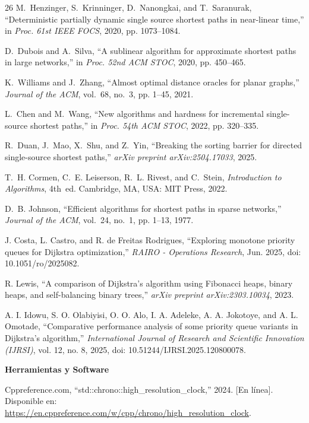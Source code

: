 \documentclass[conference]{IEEEtran}
\begin{document}
\begin{thebibliography}{26}
M.~Henzinger, S.~Krinninger, D.~Nanongkai, and T.~Saranurak,
``Deterministic partially dynamic single source shortest paths in near-linear
time,'' in \emph{Proc. 61st IEEE FOCS}, 2020, pp. 1073--1084.

D.~Dubois and A.~Silva, ``A sublinear algorithm for approximate shortest paths
in large networks,'' in \emph{Proc. 52nd ACM STOC}, 2020, pp. 450--465.

K.~Williams and J.~Zhang, ``Almost optimal distance oracles for planar graphs,''
\emph{Journal of the ACM}, vol.~68, no.~3, pp. 1--45, 2021.

L.~Chen and M.~Wang, ``New algorithms and hardness for incremental single-source
shortest paths,'' in \emph{Proc. 54th ACM STOC}, 2022, pp. 320--335.

R.~Duan, J.~Mao, X.~Shu, and Z.~Yin, ``Breaking the sorting barrier for directed
single-source shortest paths,'' \emph{arXiv preprint arXiv:2504.17033}, 2025.

T.~H. Cormen, C.~E. Leiserson, R.~L. Rivest, and C.~Stein,
\emph{Introduction to Algorithms}, 4th~ed. Cambridge, MA, USA: MIT Press, 2022.

D.~B. Johnson, ``Efficient algorithms for shortest paths in sparse networks,''
\emph{Journal of the ACM}, vol.~24, no.~1, pp. 1--13, 1977.

J. Costa, L. Castro, and R. de Freitas Rodrigues, ``Exploring monotone priority queues for Dijkstra optimization,'' \emph{RAIRO - Operations Research}, Jun. 2025, doi: 10.1051/ro/2025082.

R. Lewis, ``A comparison of Dijkstra's algorithm using Fibonacci heaps, binary heaps, and self-balancing binary trees,'' \emph{arXiv preprint arXiv:2303.10034}, 2023.

A. I. Idowu, S. O. Olabiyisi, O. O. Alo, I. A. Adeleke, A. A. Jokotoye, and A. L. Omotade, ``Comparative performance analysis of some priority queue variants in Dijkstra's algorithm,'' \emph{International Journal of Research and Scientific Innovation (IJRSI)}, vol. 12, no. 8, 2025, doi: 10.51244/IJRSI.2025.120800078.

\item[] \bigskip\noindent\textbf{Herramientas y Software}
\smallskip

Cppreference.com, ``std::chrono::high\_resolution\_clock,'' 2024. [En línea].
Disponible en: \url{https://en.cppreference.com/w/cpp/chrono/high_resolution_clock}.


\end{thebibliography}
\end{document}
